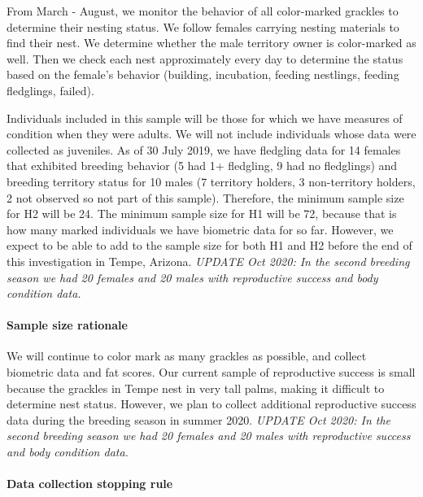 \documentclass[
]{article}
\begin{document}
From March - August, we monitor the behavior of all color-marked
grackles to determine their nesting status. We follow females carrying
nesting materials to find their nest. We determine whether the male
territory owner is color-marked as well. Then we check each nest
approximately every day to determine the status based on the female's
behavior (building, incubation, feeding nestlings, feeding fledglings,
failed).

Individuals included in this sample will be those for which we have
measures of condition when they were adults. We will not include
individuals whose data were collected as juveniles. As of 30 July 2019,
we have fledgling data for 14 females that exhibited breeding behavior
(5 had 1+ fledgling, 9 had no fledglings) and breeding territory status
for 10 males (7 territory holders, 3 non-territory holders, 2 not
observed so not part of this sample). Therefore, the minimum sample size
for H2 will be 24. The minimum sample size for H1 will be 72, because
that is how many marked individuals we have biometric data for so far.
However, we expect to be able to add to the sample size for both H1 and
H2 before the end of this investigation in Tempe, Arizona. \emph{UPDATE
Oct 2020: In the second breeding season we had 20 females and 20 males
with reproductive success and body condition data.}

\hypertarget{sample-size-rationale}{%
\paragraph{\texorpdfstring{\textbf{Sample size
rationale}}{Sample size rationale}}\label{sample-size-rationale}}

We will continue to color mark as many grackles as possible, and collect
biometric data and fat scores. Our current sample of reproductive
success is small because the grackles in Tempe nest in very tall palms,
making it difficult to determine nest status. However, we plan to
collect additional reproductive success data during the breeding season
in summer 2020. \emph{UPDATE Oct 2020: In the second breeding season we
had 20 females and 20 males with reproductive success and body condition
data.}

\hypertarget{data-collection-stopping-rule}{%
\paragraph{\texorpdfstring{\textbf{Data collection stopping
rule}}{Data collection stopping rule}}\label{data-collection-stopping-rule}}
\end{document}
